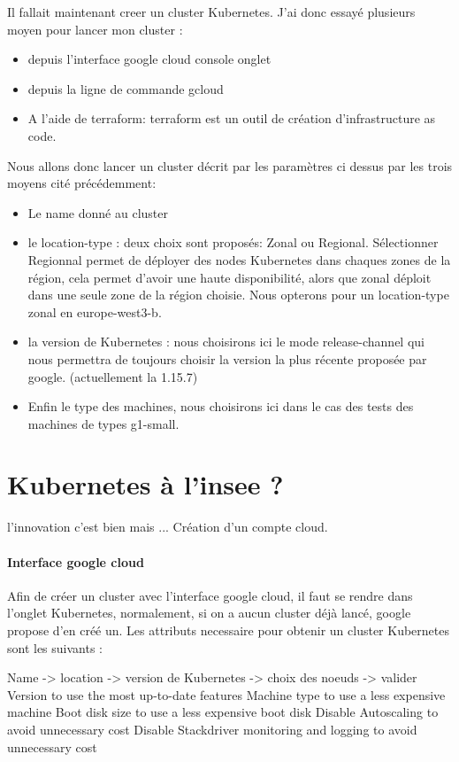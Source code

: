 \documentclass[11pt,fleqn]{book} %
\begin{document}
Il fallait maintenant creer un cluster Kubernetes. J'ai donc essayé plusieurs moyen pour lancer mon cluster : 
\begin{itemize}
    \item depuis l'interface google cloud console onglet 
    \item depuis la ligne de commande gcloud
    \item A l'aide de terraform: terraform est un outil de création d'infrastructure as code. 
\end{itemize}

Nous allons donc lancer un cluster décrit par les paramètres ci dessus par les trois moyens cité précédemment: 
\begin{itemize}
    \item Le name donné au cluster
    \item le location-type : deux choix sont proposés: Zonal ou Regional. Sélectionner Regionnal permet de déployer des nodes Kubernetes dans chaques zones de la région, cela permet d'avoir une haute disponibilité, alors que zonal déploit dans une seule zone de la région choisie. Nous opterons pour un location-type zonal en europe-west3-b.
    \item la version de Kubernetes : nous choisirons ici le mode release-channel qui nous permettra de toujours choisir la version la plus récente proposée par google. (actuellement la 1.15.7)
    \item Enfin le type des machines, nous choisirons ici dans le cas des tests des machines de types g1-small.
\end{itemize}


\section*{Kubernetes à l'insee ?}
l'innovation c'est bien mais ...
Création d'un compte cloud.



\paragraph{Interface google cloud}
Afin de créer un cluster avec l'interface google cloud, il faut se rendre dans l'onglet Kubernetes, normalement, si on a aucun cluster déjà lancé, google propose d'en créé un. Les attributs necessaire pour obtenir un cluster Kubernetes sont les suivants :

Name -> location -> version de Kubernetes -> choix des noeuds -> valider
    Version to use the most up-to-date features
    Machine type to use a less expensive machine
    Boot disk size to use a less expensive boot disk
    Disable Autoscaling to avoid unnecessary cost
    Disable Stackdriver monitoring and logging to avoid unnecessary cost 
\end{document}
